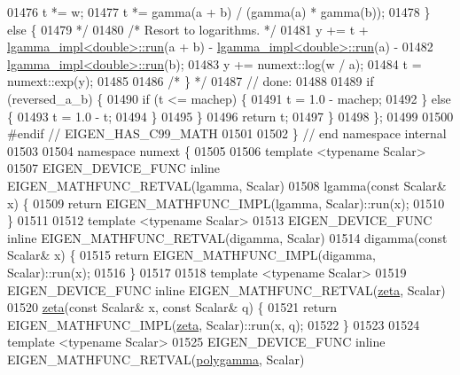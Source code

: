\begin{DoxyCode}
01476 \textcolor{comment}{      t *= w;}
01477 \textcolor{comment}{      t *= gamma(a + b) / (gamma(a) * gamma(b));}
01478 \textcolor{comment}{    \} else \{}
01479 \textcolor{comment}{    */}
01480     \textcolor{comment}{/* Resort to logarithms.  */}
01481     y += t + \hyperlink{struct_eigen_1_1internal_1_1lgamma__impl}{lgamma\_impl<double>::run}(a + b) - 
      \hyperlink{struct_eigen_1_1internal_1_1lgamma__impl}{lgamma\_impl<double>::run}(a) -
01482          \hyperlink{struct_eigen_1_1internal_1_1lgamma__impl}{lgamma\_impl<double>::run}(b);
01483     y += numext::log(w / a);
01484     t = numext::exp(y);
01485 
01486     \textcolor{comment}{/* \} */}
01487     \textcolor{comment}{// done:}
01488 
01489     \textcolor{keywordflow}{if} (reversed\_a\_b) \{
01490       \textcolor{keywordflow}{if} (t <= machep) \{
01491         t = 1.0 - machep;
01492       \} \textcolor{keywordflow}{else} \{
01493         t = 1.0 - t;
01494       \}
01495     \}
01496     \textcolor{keywordflow}{return} t;
01497   \}
01498 \};
01499 
01500 \textcolor{preprocessor}{#endif  // EIGEN\_HAS\_C99\_MATH}
01501 
01502 \}  \textcolor{comment}{// end namespace internal}
01503 
01504 \textcolor{keyword}{namespace }numext \{
01505 
01506 \textcolor{keyword}{template} <\textcolor{keyword}{typename} Scalar>
01507 EIGEN\_DEVICE\_FUNC \textcolor{keyword}{inline} EIGEN\_MATHFUNC\_RETVAL(lgamma, Scalar)
01508     lgamma(\textcolor{keyword}{const} Scalar& x) \{
01509   \textcolor{keywordflow}{return} EIGEN\_MATHFUNC\_IMPL(lgamma, Scalar)::run(x);
01510 \}
01511 
01512 \textcolor{keyword}{template} <\textcolor{keyword}{typename} Scalar>
01513 EIGEN\_DEVICE\_FUNC \textcolor{keyword}{inline} EIGEN\_MATHFUNC\_RETVAL(digamma, Scalar)
01514     digamma(\textcolor{keyword}{const} Scalar& x) \{
01515   \textcolor{keywordflow}{return} EIGEN\_MATHFUNC\_IMPL(digamma, Scalar)::run(x);
01516 \}
01517 
01518 \textcolor{keyword}{template} <\textcolor{keyword}{typename} Scalar>
01519 EIGEN\_DEVICE\_FUNC \textcolor{keyword}{inline} EIGEN\_MATHFUNC\_RETVAL(\hyperlink{namespace_eigen_af9555e27540da78d2c4bdd17d3b750b1}{zeta}, Scalar)
01520 \hyperlink{namespace_eigen_af9555e27540da78d2c4bdd17d3b750b1}{zeta}(\textcolor{keyword}{const} Scalar& x, \textcolor{keyword}{const} Scalar& q) \{
01521     \textcolor{keywordflow}{return} EIGEN\_MATHFUNC\_IMPL(\hyperlink{namespace_eigen_af9555e27540da78d2c4bdd17d3b750b1}{zeta}, Scalar)::run(x, q);
01522 \}
01523 
01524 \textcolor{keyword}{template} <\textcolor{keyword}{typename} Scalar>
01525 EIGEN\_DEVICE\_FUNC \textcolor{keyword}{inline} EIGEN\_MATHFUNC\_RETVAL(\hyperlink{namespace_eigen_ae3b47a13a0699f5dbaa0623c11333dca}{polygamma}, Scalar)

\end{DoxyCode}
